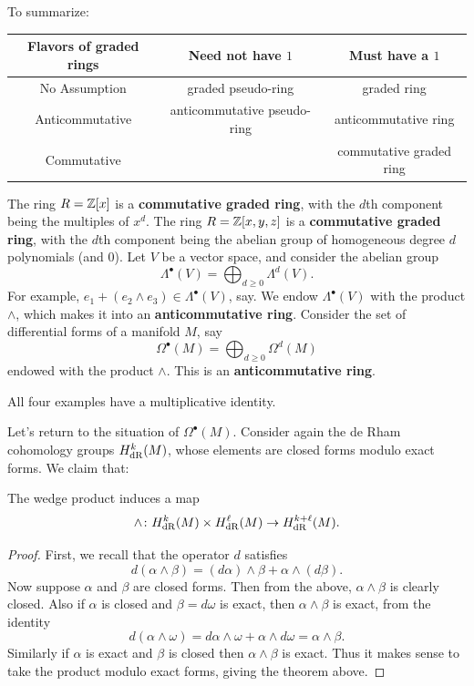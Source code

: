 To summarize:
\begin{center}
	\small
	\begin{tabular}[h]{|c|cc|}
		\hline
		\textbf{Flavors of graded rings} &
		Need not have $1$ & Must have a $1$ \\ \hline
		No Assumption & graded pseudo-ring & graded ring \\
		Anticommutative & anticommutative pseudo-ring & anticommutative ring \\
		Commutative &  & commutative graded ring \\ \hline
	\end{tabular}
\end{center}

\begin{example}
	\listhack
	\begin{enumerate}[(a)]
		\ii The ring $R = \mathbb Z[x]$ is a \textbf{commutative graded ring},
		with the $d$th component being the multiples of $x^d$.
		\ii The ring $R = \mathbb Z[x,y,z]$ is a \textbf{commutative graded ring},
		with the $d$th component being the abelian group
		of homogeneous degree $d$ polynomials (and $0$).
		\ii Let $V$ be a vector space, and consider
		the abelian group
		\[ \Lambda^\bullet(V) = \bigoplus_{d \ge 0} \Lambda^d(V). \]
		For example, $e_1 + (e_2 \wedge e_3) \in \Lambda^\bullet(V)$, say.
		We endow $\Lambda^\bullet(V)$ with the product $\wedge$,
		which makes it into an \textbf{anticommutative ring}.
		\ii Consider the set of differential forms of a manifold $M$,
		say \[ \Omega^\bullet(M) = \bigoplus_{d \ge 0} \Omega^d(M) \]
		endowed with the product $\wedge$.
		This is an \textbf{anticommutative ring}.
	\end{enumerate}
	All four examples have a multiplicative identity.
\end{example}

Let's return to the situation of $\Omega^\bullet(M)$.
Consider again the de Rham cohomology groups $H_{\mathrm{dR}}^k(M)$,
whose elements are closed forms modulo exact forms.
We claim that:
\begin{lemma}
	The wedge product induces a map
	\[ \wedge \colon H_{\mathrm{dR}}^k(M) \times H_{\mathrm{dR}}^\ell(M) \to H_{\mathrm{dR}}^{k+\ell}(M). \]
\end{lemma}
\begin{proof}
	First, we recall that the operator $d$ satisfies
	\[
		d(\alpha \wedge \beta)
		= (d\alpha) \wedge \beta + \alpha \wedge (d\beta).
	\]
	Now suppose $\alpha$ and $\beta$ are closed forms.
	Then from the above, $\alpha \wedge \beta$ is clearly closed.
	Also if $\alpha$ is closed and $\beta = d\omega$ is exact,
	then $\alpha \wedge \beta$ is exact, from the identity
	\[ d(\alpha \wedge \omega)
		= d\alpha \wedge\omega + \alpha \wedge d\omega = \alpha \wedge \beta. \]
	Similarly if $\alpha$ is exact and $\beta$ is closed
	then $\alpha \wedge \beta$ is exact.
	Thus it makes sense to take the product modulo exact forms,
	giving the theorem above.
\end{proof}


